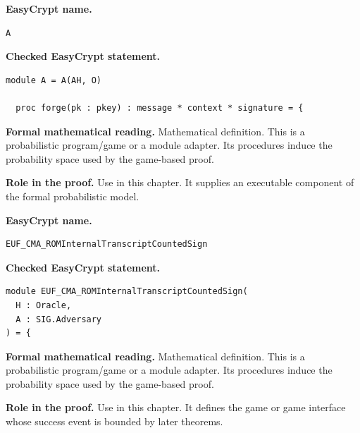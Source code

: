 \begin{formaldefinition}
\noindent\textbf{EasyCrypt name.}
\begin{lstlisting}[language=EasyCrypt,basicstyle=\ttfamily\scriptsize]
A
\end{lstlisting}
\noindent\textbf{Checked EasyCrypt statement.}
\begin{lstlisting}[language=EasyCrypt,basicstyle=\ttfamily\scriptsize]
module A = A(AH, O)

  proc forge(pk : pkey) : message * context * signature = {
\end{lstlisting}
\noindent\textbf{Formal mathematical reading.}
Mathematical definition. This is a probabilistic program/game or a module adapter.  Its procedures induce the probability space used by the game-based proof.

\noindent\textbf{Role in the proof.}
Use in this chapter. It supplies an executable component of the formal probabilistic model.

\end{formaldefinition}

\begin{formaldefinition}
\noindent\textbf{EasyCrypt name.}
\begin{lstlisting}[language=EasyCrypt,basicstyle=\ttfamily\scriptsize]
EUF_CMA_ROMInternalTranscriptCountedSign
\end{lstlisting}
\noindent\textbf{Checked EasyCrypt statement.}
\begin{lstlisting}[language=EasyCrypt,basicstyle=\ttfamily\scriptsize]
module EUF_CMA_ROMInternalTranscriptCountedSign(
  H : Oracle,
  A : SIG.Adversary
) = {
\end{lstlisting}
\noindent\textbf{Formal mathematical reading.}
Mathematical definition. This is a probabilistic program/game or a module adapter.  Its procedures induce the probability space used by the game-based proof.

\noindent\textbf{Role in the proof.}
Use in this chapter. It defines the game or game interface whose success event is bounded by later theorems.

\end{formaldefinition}


